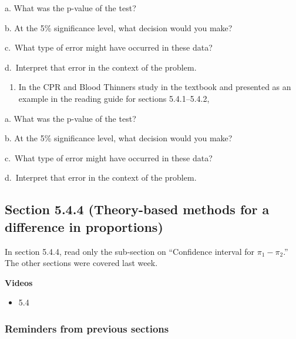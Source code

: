 \documentclass[
]{report}
\providecommand{\tightlist}{%
  \setlength{\itemsep}{0pt}\setlength{\parskip}{0pt}}
\newcommand{\rgs}{\vspace{12pt}} %
\newcommand{\rgi}{\hspace{24pt}}  %
\begin{document}
\rgi a. What was the p-value of the test?
\rgs

\rgi b. At the 5\% significance level, what decision would you make?
\rgs

\rgi c.~What type of error might have occurred in these data?
\rgs

\rgi d.~Interpret that error in the context of the problem.
\rgs
\rgs

\begin{enumerate}
\def\labelenumi{\arabic{enumi}.}
\setcounter{enumi}{2}
\tightlist
\item
  In the CPR and Blood Thinners study in the textbook and presented as an example in the reading guide for sections 5.4.1--5.4.2,
\end{enumerate}

\rgi a. What was the p-value of the test?
\rgs

\rgi b. At the 5\% significance level, what decision would you make?
\rgs

\rgi c.~What type of error might have occurred in these data?
\rgs

\rgi d.~Interpret that error in the context of the problem.
\rgs
\rgs

\hypertarget{section-5.4.4-theory-based-methods-for-a-difference-in-proportions-1}{%
\subsection*{Section 5.4.4 (Theory-based methods for a difference in proportions)}\label{section-5.4.4-theory-based-methods-for-a-difference-in-proportions-1}}


In section 5.4.4, read only the sub-section on ``Confidence interval for \(\pi_1 - \pi_2\).'' The other sections were covered last week.

\textbf{Videos}

\begin{itemize}
\tightlist
\item
  5.4
\end{itemize}


\hypertarget{reminders-from-previous-sections-6}{%
\subsubsection*{Reminders from previous sections}\label{reminders-from-previous-sections-6}}
\end{document}
